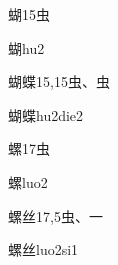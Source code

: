 \begin{Entry}{蝴}{15}{⾍}
  \begin{Phonetics}{蝴}{hu2}
  \end{Phonetics}
\end{Entry}

\begin{Entry}{蝴蝶}{15,15}{⾍、⾍}
  \begin{Phonetics}{蝴蝶}{hu2die2}
  \end{Phonetics}
\end{Entry}

\begin{Entry}{螺}{17}{⾍}
  \begin{Phonetics}{螺}{luo2}
  \end{Phonetics}
\end{Entry}

\begin{Entry}{螺丝}{17,5}{⾍、⼀}
  \begin{Phonetics}{螺丝}{luo2si1}
  \end{Phonetics}
\end{Entry}


